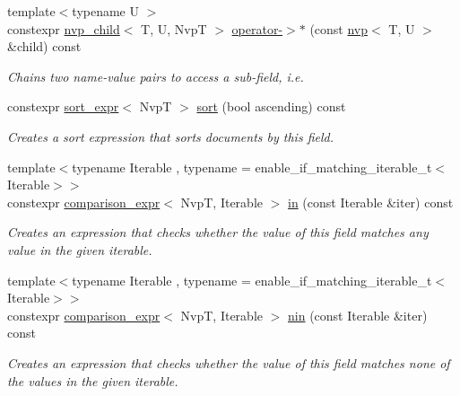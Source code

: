 \begin{DoxyCompactItemize}
\item 
{\footnotesize template$<$typename U $>$ }\\constexpr \hyperlink{classmongo__odm_1_1nvp__child}{nvp\+\_\+child}$<$ T, U, NvpT $>$ \hyperlink{classmongo__odm_1_1nvp__base_af99c8f015456c41a778361e44a22a41c}{operator-\/$>$$\ast$} (const \hyperlink{classmongo__odm_1_1nvp}{nvp}$<$ T, U $>$ \&child) const 
\begin{DoxyCompactList}\small\item\em Chains two name-\/value pairs to access a sub-\/field, i.\+e. \end{DoxyCompactList}\item 
constexpr \hyperlink{classmongo__odm_1_1sort__expr}{sort\+\_\+expr}$<$ NvpT $>$ \hyperlink{classmongo__odm_1_1nvp__base_a6a8d165cfc00d3bcd70d16a2c704ae0e}{sort} (bool ascending) const 
\begin{DoxyCompactList}\small\item\em Creates a sort expression that sorts documents by this field. \end{DoxyCompactList}\item 
{\footnotesize template$<$typename Iterable , typename  = enable\+\_\+if\+\_\+matching\+\_\+iterable\+\_\+t$<$\+Iterable$>$$>$ }\\constexpr \hyperlink{classmongo__odm_1_1comparison__expr}{comparison\+\_\+expr}$<$ NvpT, Iterable $>$ \hyperlink{classmongo__odm_1_1nvp__base_ab96c904c4c587d9adb62f372d763eb89}{in} (const Iterable \&iter) const 
\begin{DoxyCompactList}\small\item\em Creates an expression that checks whether the value of this field matches any value in the given iterable. \end{DoxyCompactList}\item 
{\footnotesize template$<$typename Iterable , typename  = enable\+\_\+if\+\_\+matching\+\_\+iterable\+\_\+t$<$\+Iterable$>$$>$ }\\constexpr \hyperlink{classmongo__odm_1_1comparison__expr}{comparison\+\_\+expr}$<$ NvpT, Iterable $>$ \hyperlink{classmongo__odm_1_1nvp__base_ac518ef90312a483c64436097e9f9a34e}{nin} (const Iterable \&iter) const 
\begin{DoxyCompactList}\small\item\em Creates an expression that checks whether the value of this field matches none of the values in the given iterable. \end{DoxyCompactList}\item 

\end{DoxyCompactItemize}
